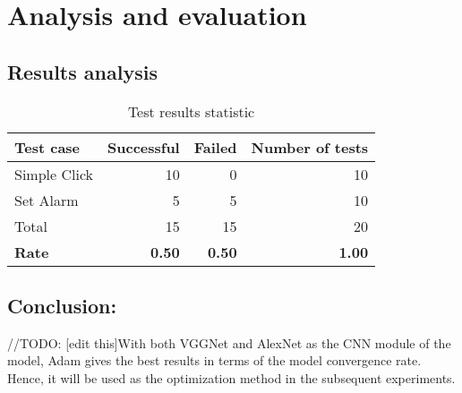 \section{Analysis and evaluation}
\subsection{Results analysis}
\begin{table}[H]
	\centering
	\caption{Test results statistic}	
	\label{tab:result_stat}
	\begin{tabularx}{0.65\textwidth}{l|rrr}
		\hline
		Test case & Successful & Failed & Number of tests \\
		\hline
		Simple Click & 10 & 0 & 10 \\
		Set Alarm & 5 & 5 & 10 \\
		\hline
		Total & 15 & 15 & 20 \\
		\hline
		\textbf{Rate} & \textbf{0.50} & \textbf{0.50} & \textbf{1.00} \\
		\hline
	\end{tabularx}
\end{table}

\subsection{Conclusion:} //TODO: [edit this]With both VGGNet and AlexNet as the CNN module of the model, Adam gives the best results in terms of the model convergence rate. Hence, it will be used as the optimization method in the subsequent experiments.
